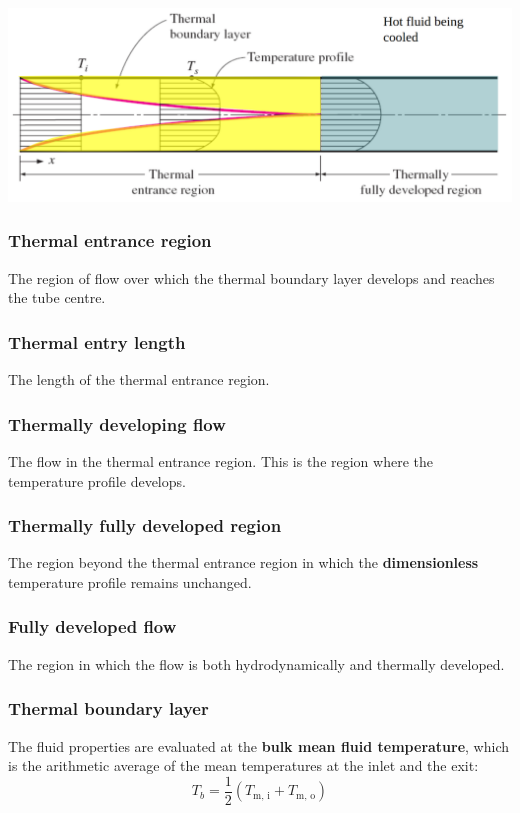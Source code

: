\documentclass[11pt]{article}
\begin{document}
\begin{center}
\includegraphics[width=.9\linewidth]{./images/thermal-entrance-region-diagram.png}
\end{center}

\subsubsection{Thermal entrance region}
\label{sec:orgb5e351d}
The region of flow over which the thermal boundary layer develops and reaches the tube centre.

\subsubsection{Thermal entry length}
\label{sec:org59a3eeb}
The length of the thermal entrance region.

\subsubsection{Thermally developing flow}
\label{sec:org822f9f4}
The flow in the thermal entrance region. This is the region where the temperature profile develops.

\subsubsection{Thermally fully developed region}
\label{sec:org3899080}
The region beyond the thermal entrance region in which the \textbf{dimensionless} temperature profile remains unchanged.

\subsubsection{Fully developed flow}
\label{sec:orgd5efc35}
The region in which the flow is both hydrodynamically and thermally developed.

\subsubsection{Thermal boundary layer}
\label{sec:orgf378e66}
The fluid properties are evaluated at the \textbf{bulk mean fluid temperature}, which is the arithmetic average of the mean temperatures at the inlet and the exit:
\[T_b = \frac{1}{2} (T_{\text{m, i}} + T_{\text{m, o}})\]
\end{document}

